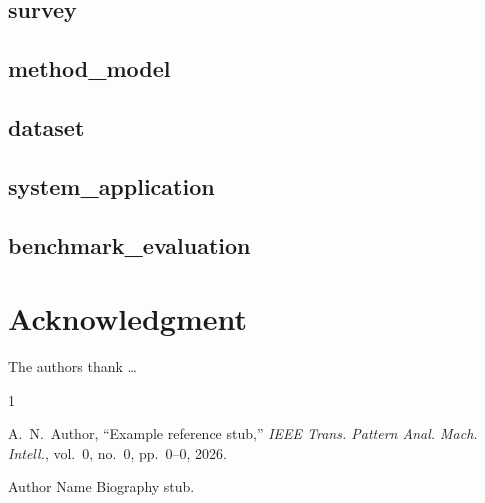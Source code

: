 \documentclass[lettersize,journal]{IEEEtran}
\begin{document}
\subsection{survey}

\subsection{method\_model}

\subsection{dataset}

\subsection{system\_application}

\subsection{benchmark\_evaluation}



\section*{Acknowledgment}
The authors thank \ldots\ %

\begin{thebibliography}{1}


A.~N.~Author, ``Example reference stub,'' \textit{IEEE Trans. Pattern Anal. Mach. Intell.}, vol.~0, no.~0, pp.~0--0, 2026.

\end{thebibliography}

\begin{IEEEbiographynophoto}{Author Name}
Biography stub.
\end{IEEEbiographynophoto}
\end{document}

